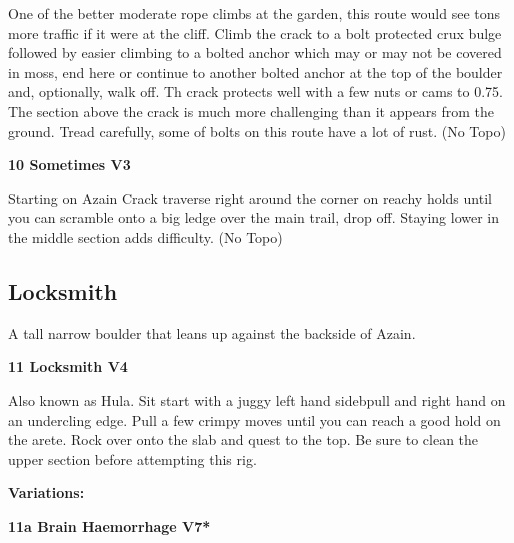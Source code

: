 \begin{multicols}{2}
			\begin{adjustwidth}{0.5cm}{}				
			One of the better moderate rope climbs at the garden, this route would see tons more traffic if it were at the cliff. Climb the crack to a bolt protected crux bulge followed by easier climbing to a bolted anchor which may or may not be covered in moss, end here or continue to another bolted anchor at the top of the boulder and, optionally, walk off. Th crack protects well with a few nuts or cams to 0.75. The section above the crack is much more challenging than it appears from the ground. Tread carefully, some of bolts on this route have a lot of rust.
				\newline (No Topo) 
			\end{adjustwidth}
			\label{rt:Sometimes}
\colorbox{green!20}{
\parbox{0.95\linewidth}{
\textbf{
10 Sometimes V3  
}
}
}

			\begin{adjustwidth}{0.5cm}{}				
			Starting on Azain Crack traverse right around the corner on reachy holds until you can scramble onto a big ledge over the main trail, drop off. Staying lower in the middle section adds difficulty.
				\newline (No Topo) 
			\end{adjustwidth}
		\subsection*{Locksmith}\label{bf:Locksmith}
		A tall narrow boulder that leans up against the backside of Azain.\\
	

			\label{rt:Locksmith}
\colorbox{RoyalBlue!20}{
\parbox{0.95\linewidth}{
\textbf{
11 Locksmith V4  \warn\warn
}
}
}

			\begin{adjustwidth}{0.5cm}{}				
			Also known as Hula. Sit start with a juggy left hand sidebpull and right hand on an undercling edge. Pull a few crimpy moves until you can reach a good hold on the arete. Rock over onto the slab and quest to the top. Be sure to clean the upper section before attempting this rig.
			\end{adjustwidth}
				\begin{adjustwidth}{0.5cm}{}				
				\textbf{Variations:} \newline
					\label{vr:Brain Haemorrhage}
\colorbox{Goldenrod!50}{
\parbox{0.95\linewidth}{
\textbf{
11a Brain Haemorrhage V7*  
}
}
}


\end{adjustwidth}
\end{multicols}
